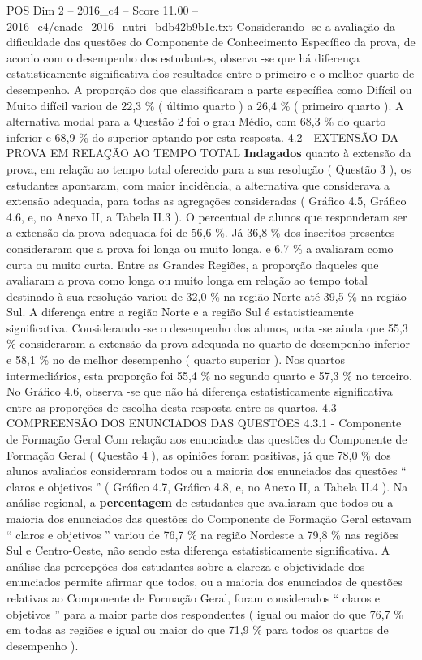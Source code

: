 \begin{textsample}{POS Dim 2 – 2016\_c4 – Score 11.00 – 2016\_c4/enade\_2016\_nutri\_bdb42b9b1c.txt}
Considerando -se a avaliação da dificuldade das questões do Componente de Conhecimento Específico da prova, de acordo com o desempenho dos estudantes, observa -se que há diferença estatisticamente significativa dos resultados entre o primeiro e o melhor quarto de desempenho.
A proporção dos que classificaram a parte específica como Difícil ou Muito difícil variou de 22,3 \% ( último quarto ) a 26,4 \% ( primeiro quarto ).
A alternativa modal para a Questão 2 foi o grau Médio, com 68,3 \% do quarto inferior e 68,9 \% do superior optando por esta resposta. 4.2 - EXTENSÃO DA PROVA EM RELAÇÃO AO TEMPO TOTAL \textbf{Indagados} quanto à extensão da prova, em relação ao tempo total oferecido para a sua resolução ( Questão 3 ), os estudantes apontaram, com maior incidência, a alternativa que considerava a extensão adequada, para todas as agregações consideradas ( Gráfico 4.5, Gráfico 4.6, e, no Anexo II, a Tabela II.3 ).
O percentual de alunos que responderam ser a extensão da prova adequada foi de 56,6 \%.
Já 36,8 \% dos inscritos presentes consideraram que a prova foi longa ou muito longa, e 6,7 \% a avaliaram como curta ou muito curta.
Entre as Grandes Regiões, a proporção daqueles que avaliaram a prova como longa ou muito longa em relação ao tempo total destinado à sua resolução variou de 32,0 \% na região Norte até 39,5 \% na região Sul.
A diferença entre a região Norte e a região Sul é estatisticamente significativa.
Considerando -se o desempenho dos alunos, nota -se ainda que 55,3 \% consideraram a extensão da prova adequada no quarto de desempenho inferior e 58,1 \% no de melhor desempenho ( quarto superior ).
Nos quartos intermediários, esta proporção foi 55,4 \% no segundo quarto e 57,3 \% no terceiro.
No Gráfico 4.6, observa -se que não há diferença estatisticamente significativa entre as proporções de escolha desta resposta entre os quartos. 4.3 - COMPREENSÃO DOS ENUNCIADOS DAS QUESTÕES 4.3.1 - Componente de Formação Geral Com relação aos enunciados das questões do Componente de Formação Geral ( Questão 4 ), as opiniões foram positivas, já que 78,0 \% dos alunos avaliados consideraram todos ou a maioria dos enunciados das questões “ claros e objetivos ” ( Gráfico 4.7, Gráfico 4.8, e, no Anexo II, a Tabela II.4 ).
Na análise regional, a \textbf{percentagem} de estudantes que avaliaram que todos ou a maioria dos enunciados das questões do Componente de Formação Geral estavam “ claros e objetivos ” variou de 76,7 \% na região Nordeste a 79,8 \% nas regiões Sul e Centro-Oeste, não sendo esta diferença estatisticamente significativa.
A análise das percepções dos estudantes sobre a clareza e objetividade dos enunciados permite afirmar que todos, ou a maioria dos enunciados de questões relativas ao Componente de Formação Geral, foram considerados “ claros e objetivos ” para a maior parte dos respondentes ( igual ou maior do que 76,7 \% em todas as regiões e igual ou maior do que 71,9 \% para todos os quartos de desempenho ).

\end{textsample}
